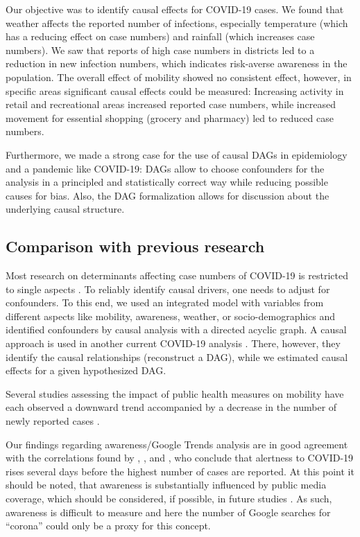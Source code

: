 \documentclass[]{elsarticle} %
\begin{document}
Our objective was to identify causal effects for COVID-19 cases. We found that weather affects the reported number of infections, especially temperature (which has a reducing effect on case numbers) and rainfall (which increases case numbers). We saw that reports of high case numbers in districts led to a reduction in new infection numbers, which indicates risk-averse awareness in the population. The overall effect of mobility showed no consistent effect, however, in specific areas significant causal effects could be measured: Increasing activity in retail and recreational areas increased reported case numbers, while increased movement for essential shopping (grocery and pharmacy) led to reduced case numbers.

Furthermore, we made a strong case for the use of causal DAGs in epidemiology and a pandemic like COVID-19: DAGs allow to choose confounders for the analysis in a principled and statistically correct way while reducing possible causes for bias. Also, the DAG formalization allows for discussion about the underlying causal structure.

\hypertarget{comparison-with-previous-research}{%
\subsection{Comparison with previous research}\label{comparison-with-previous-research}}

Most research on determinants affecting case numbers of COVID-19 is restricted to single aspects \citep{fowler_effect_2020, li_retrospective_2020, shi_impact_2020, Wang2020temperature}. To reliably identify causal drivers, one needs to adjust for confounders. To this end, we used an integrated model with variables from different aspects like mobility, awareness, weather, or socio-demographics and identified confounders by causal analysis with a directed acyclic graph. A causal approach is used in another current COVID-19 analysis \citep{gencoglu2020causal}. There, however, they identify the causal relationships (reconstruct a DAG), while we estimated causal effects for a given hypothesized DAG.

Several studies assessing the impact of public health measures on mobility have each observed a downward trend accompanied by a decrease in the number of newly reported cases \citep{chang_modeling_2020, cowling2020impact, fowler_effect_2020, kraemer_effect_2020, lai_effect_2020, linka_outbreak_2020}.

Our findings regarding awareness/Google Trends analysis are in good agreement with the correlations found by \citet{effenberger_association_2020}, \citet{higgins_correlations_2020}, and \citet{yuan_trends_2020}, who conclude that alertness to COVID-19 rises several days before the highest number of cases are reported. At this point it should be noted, that awareness is substantially influenced by public media coverage, which should be considered, if possible, in future studies \citep{higgins_correlations_2020}. As such, awareness is difficult to measure and here the number of Google searches for ``corona'' could only be a proxy for this concept.
\end{document}
